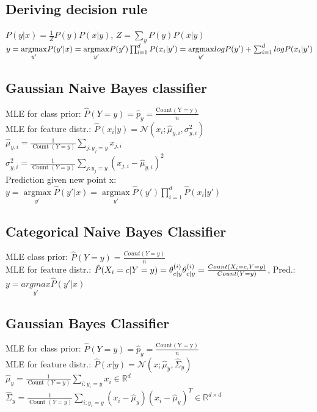 \subsection*{Deriving decision rule}
$P(y|x) = \frac{1}{Z} P(y)P(x|y)$, $Z = \sum_y P(y) P(x|y)$\\
$y = \underset{y'}{\operatorname{argmax}} P(y'|x) = \underset{y'}{\operatorname{argmax}} P(y') \prod_{i=1}^d P(x_i|y')\\
= \underset{y'}{\operatorname{argmax}} log P(y') + \sum_{i=1}^d log P(x_i|y')$

\subsection*{Gaussian Naive Bayes classifier}
MLE for class prior: $\hat{P}(Y=y) = \hat{p}_y = \frac{\operatorname{Count(Y = y)}}{n}$\\
MLE for feature distr.: $\hat{P}(x_i|y) =  \mathcal{N}(x_i;\hat{\mu}_{y,i}, \sigma_{y,i}^2)$\\
$\hat{\mu}_{y,i} = \frac{1}{\operatorname{Count}(Y=y)} \sum_{j:y_j=y} x_{j,i}$\\
$\sigma_{y,i}^2 = \frac{1}{\operatorname{Count}(Y=y)} \sum_{j:y_j=y} (x_{j,i} - \hat{\mu}_{y,i})^2$\\
Prediction given new point x:\\
$y = \underset{y'}{\operatorname{argmax}} \hat{P}(y'|x) = \underset{y'}{\operatorname{argmax}} \hat{P}(y') \prod_{i=1}^d \hat{P}(x_i|y')$

\subsection*{Categorical Naive Bayes Classifier}
MLE class prior: $\hat{P}(Y=y) = \frac{Count(Y=y)}{n}$\\
MLE for feature distr.:
$\hat{P}(X_i = c|Y = y) = \theta_{c|y}^{(i)}\\
\theta_{c|y}^{(i)} = \frac{Count(X_i = c, Y = y)}{Count(Y=y)}$, Pred.: $y = \underset{y'}{argmax}\hat{P}(y'|x)$

\subsection*{Gaussian Bayes Classifier}
MLE for class prior: $\hat{P}(Y=y) = \hat{p}_y = \frac{\operatorname{Count(Y = y)}}{n}$\\
MLE for feature distr.: $\hat{P}(x|y) = \mathcal{N}(x ; \hat{\mu}_y, \hat{\Sigma}_y)$\\
$\hat{\mu}_{y} = \frac{1}{\operatorname{Count}(Y=y)} \sum_{i:y_i=y} x_i \in \mathbb{R}^d$\\
$\hat{\Sigma}_{y} = \frac{1}{\operatorname{Count}(Y=y)} \sum_{i:y_i=y} (x_i - \hat{\mu}_{y})(x_i-\hat{\mu}_y)^T \in \mathbb{R}^{d \times d}$

